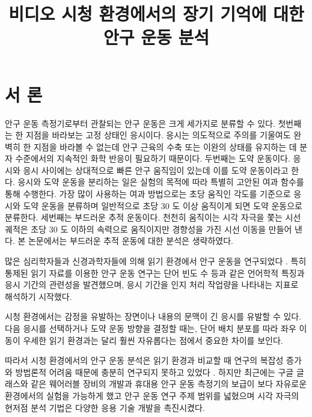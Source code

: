 \documentclass{kcc}
\title{비디오 시청 환경에서의 장기 기억에 대한 안구 운동 분석}
\author{
}
\begin{document}
\maketitle


\section{서 론}

안구 운동 측정기로부터 관찰되는 안구 운동은 크게 세가지로 분류할 수 있다. 첫번째는 한 지점을 바라보는 고정 상태인 응시이다. 응시는 의도적으로 주의를 기울여도 완벽히 한 지점을 바라볼 수 없는데 안구 근육의 수축 또는 이완의 상태를 유지하는 데 분자 수준에서의 지속적인 화학 반응이 필요하기 때문이다. 두번째는 도약 운동이다. 응시와 응시 사이에는 상대적으로 빠른 안구 움직임이 있는데 이를 도약 운동이라고 한다. 응시와 도약 운동을 분리하는 일은 실험의 목적에 따라 특별히 고안된 여과 함수를 통해 수행한다. 가장 많이 사용하는 여과 방법으로는 초당 움직인 각도를 기준으로 응시와 도약 운동을 분류하며 일반적으로 초당 30 도 이상 움직이게 되면 도약 운동으로 분류한다. 세번째는 부드러운 추적 운동이다. 천천히 움직이는 시각 자극을 쫓는 시선 궤적은 초당 30 도 이하의 속력으로 움직이지만 경향성을 가진 시선 이동을 만들어 낸다. 본 논문에서는 부드러운 추적 운동에 대한 분석은 생략하였다.

많은 심리학자들과 신경과학자들에 의해 읽기 환경에서 안구 운동을 연구되었다 \cite{Rayner1998,Reichle1998}. 특히 통제된 읽기 자료를 이용한 안구 운동 연구\cite{Inhoff1986,Rayner1986}는 단어 빈도 수 등과 같은 언어학적 특징과 응시 기간의 관련성을 발견했으며, 응시 기간을 인지 처리 작업량을 나타내는 지표로 해석하기 시작했다. 

시청 환경에서는 감정을 유발하는 장면이나 내용의 문맥이 긴 응시를 유발할 수 있다. 다음 응시를 선택하거나 도약 운동 방향을 결정할 때는, 단어 배치 분포를 따라 좌우 이동이 우세한 읽기 환경과는 달리 훨씬 자유롭다는 점에서 중요한 차이를 보인다.

따라서 시청 환경에서의 안구 운동 분석은 읽기 환경과 비교할 때 연구의 복잡성 증가\cite{Choe2013}와 방법론적 어려움 때문에 충분히 연구되지 못하고 있었다 \cite{Tatler2011}. 하지만 최근에는 구글 글래스와 같은 웨어러블 장비의 개발과 휴대용 안구 운동 측정기의 보급이 보다 자유로운 환경에서의 실험을 가능하게 했고 안구 운동 연구 주제 범위를 넓혔으며 시각 자극의 현저점 분석 기법\cite{itti1998model}은 다양한 응용 기술 개발을 촉진시켰다. 
\end{document}

